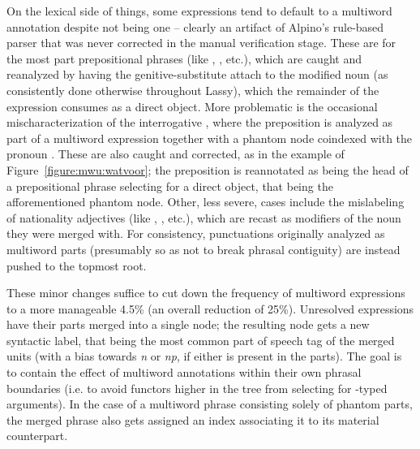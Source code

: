 On the lexical side of things, some expressions tend to default to a multiword annotation despite not being one -- clearly an artifact of Alpino's rule-based parser that was never corrected in the manual verification stage.
These are for the most part prepositional phrases (like , , etc.), which are caught and reanalyzed by having the genitive-substitute  attach to the modified noun (as consistently done otherwise throughout Lassy), which the remainder of the expression consumes as a direct object.
More problematic is the occasional mischaracterization of the interrogative , where the preposition  is analyzed as part of a multiword expression together with a phantom node coindexed with the pronoun .
These are also caught and corrected, as in the example of Figure~\ref{figure:mwu:watvoor}; the preposition is reannotated as being the head of a prepositional phrase selecting for a direct object, that being the afforementioned phantom node.
Other, less severe, cases include the mislabeling of nationality adjectives (like , , etc.), which are recast as modifiers of the noun they were merged with.
For consistency, punctuations originally analyzed as multiword parts (presumably so as not to break phrasal contiguity) are instead pushed to the topmost root.

These minor changes suffice to cut down the frequency of multiword expressions to a more manageable 4.5\% (an overall reduction of 25\%).
Unresolved expressions have their parts merged into a single node; the resulting node gets a new syntactic label, that being the most common part of speech tag of the merged units (with a bias towards \textit{n} or \textit{np}, if either is present in the parts).
The goal is to contain the effect of multiword annotations within their own phrasal boundaries (i.e. to avoid functors higher in the tree from selecting for -typed arguments).
In the case of a multiword phrase consisting solely of phantom parts, the merged phrase also gets assigned an index associating it to its material counterpart.

